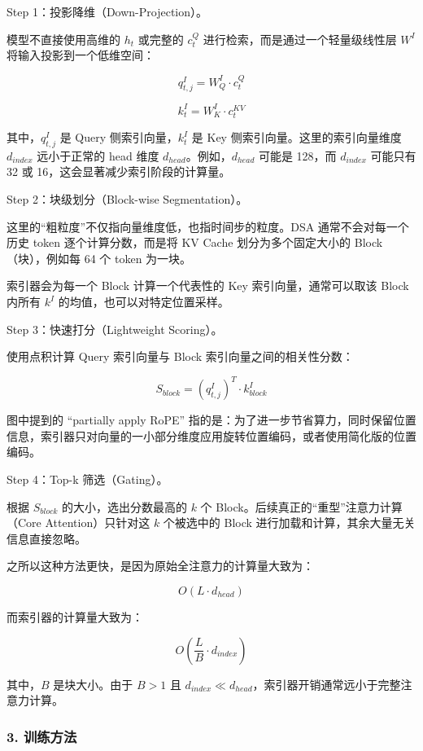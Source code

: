 Step 1：投影降维（Down-Projection）。

模型不直接使用高维的 \(h_t\) 或完整的 \(c_t^Q\) 进行检索，而是通过一个轻量级线性层 \(W^I\) 将输入投影到一个低维空间：

\[
q^I_{t,j} = W^I_Q \cdot c^Q_t
\]

\[
k^I_t = W^I_K \cdot c^{KV}_t
\]

其中，\(q^I_{t,j}\) 是 Query 侧索引向量，\(k^I_t\) 是 Key 侧索引向量。这里的索引向量维度 \(d_{index}\) 远小于正常的 head 维度 \(d_{head}\)。例如，\(d_{head}\) 可能是 128，而 \(d_{index}\) 可能只有 32 或 16，这会显著减少索引阶段的计算量。

Step 2：块级划分（Block-wise Segmentation）。

这里的``粗粒度''不仅指向量维度低，也指时间步的粒度。DSA 通常不会对每一个历史 token 逐个计算分数，而是将 KV Cache 划分为多个固定大小的 Block（块），例如每 64 个 token 为一块。

索引器会为每一个 Block 计算一个代表性的 Key 索引向量，通常可以取该 Block 内所有 \(k^I\) 的均值，也可以对特定位置采样。

Step 3：快速打分（Lightweight Scoring）。

使用点积计算 Query 索引向量与 Block 索引向量之间的相关性分数：

\[
S_{block} = (q^I_{t,j})^T \cdot k^I_{block}
\]

图中提到的 ``partially apply RoPE'' 指的是：为了进一步节省算力，同时保留位置信息，索引器只对向量的一小部分维度应用旋转位置编码，或者使用简化版的位置编码。

Step 4：Top-k 筛选（Gating）。

根据 \(S_{block}\) 的大小，选出分数最高的 \(k\) 个 Block。后续真正的``重型''注意力计算（Core Attention）只针对这 \(k\) 个被选中的 Block 进行加载和计算，其余大量无关信息直接忽略。

之所以这种方法更快，是因为原始全注意力的计算量大致为：

\[
O(L \cdot d_{head})
\]

而索引器的计算量大致为：

\[
O\left(\frac{L}{B} \cdot d_{index}\right)
\]

其中，\(B\) 是块大小。由于 \(B > 1\) 且 \(d_{index} \ll d_{head}\)，索引器开销通常远小于完整注意力计算。

\hypertarget{ux8badux7ec3ux65b9ux6cd5}{%
\subsubsection{3. 训练方法}\label{ux8badux7ec3ux65b9ux6cd5}}

